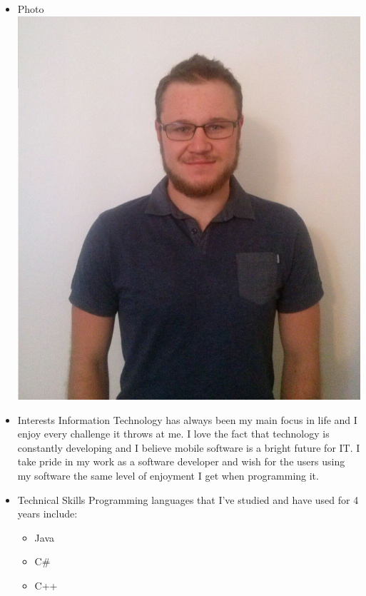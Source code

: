 \documentclass[12pt, oneside]{article}
\begin{document}
\begin{enumerate}
		\begin{itemize}
			\item Photo\newline
				\includegraphics[scale=0.1]{Andreas} %
			\item Interests\newline
				Information Technology has always been my main focus in life and I enjoy every challenge it throws at me.
				I love the fact that technology is constantly developing and I believe mobile software is a bright future for IT. 
				I take pride in my work as a software developer and wish for the users using my software the same level of enjoyment I get when programming it.
			\item Technical Skills\newline
			Programming languages that I've studied and have used for 4 years include:
								\begin{itemize}
								\item Java\newline
								\item C#\newline
								\item C++\newline

\end{itemize}
\end{itemize}
\end{enumerate}
\end{document}
